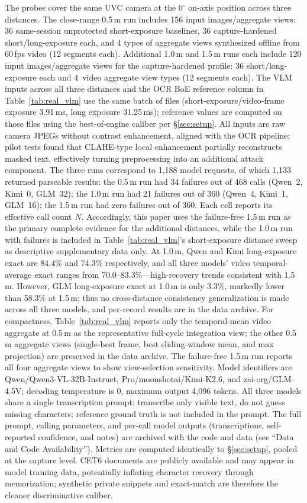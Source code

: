\documentclass{ieeeaccess}
\begin{document}
The probes cover the same UVC camera at the 0$^{\circ}$ on-axis position across three distances. The close-range 0.5\,m run includes 156 input images/aggregate views: 36 same-session unprotected short-exposure baselines, 36 capture-hardened short/long-exposure each, and 4 types of aggregate views synthesized offline from 60\,fps video (12 segments each). Additional 1.0\,m and 1.5\,m runs each include 120 input images/aggregate views for the capture-hardened profile: 36 short/long-exposure each and 4~video aggregate view types (12 segments each). The VLM inputs across all three distances and the OCR BoE reference column in Table~\ref{tab:real_vlm} use the same batch of files (short-exposure/video-frame exposure 3.91\,ms, long exposure 31.25\,ms); reference values are computed on those files using the best-of-engine caliber per \S\ref{sec:setup}. All inputs are raw camera JPEGs without contrast enhancement, aligned with the OCR pipeline; pilot tests found that CLAHE-type local enhancement partially reconstructs masked text, effectively turning preprocessing into an additional attack component. The three runs correspond to 1,188 model requests, of which 1,133 returned parseable results: the 0.5\,m run had 34 failures out of 468 calls (Qwen~2, Kimi~0, GLM~32); the 1.0\,m run had 21 failures out of 360 (Qwen~4, Kimi~1, GLM~16); the 1.5\,m run had zero failures out of 360. Each cell reports its effective call count $N$. Accordingly, this paper uses the failure-free 1.5\,m run as the primary complete evidence for the additional distances, while the 1.0\,m run with failures is included in Table~\ref{tab:real_vlm}'s short-exposure distance sweep as descriptive supplementary data only. At 1.0\,m, Qwen and Kimi long-exposure exact are 84.4\% and 74.3\% respectively, and all three models' video temporal-average exact ranges from 70.0--83.3\%---high-recovery trends consistent with 1.5\,m. However, GLM long-exposure exact at 1.0\,m is only 3.3\%, markedly lower than 58.3\% at 1.5\,m; thus no cross-distance consistency generalization is made across all three models, and per-record results are in the data archive. For compactness, Table~\ref{tab:real_vlm} reports only the temporal-mean video aggregate at 0.5\,m as the representative full-cycle integration view; the other 0.5\,m aggregate views (single-best frame, best sliding-window mean, and max projection) are preserved in the data archive. The failure-free 1.5\,m run reports all four aggregate views to show view-selection sensitivity. Model identifiers are Qwen/Qwen3-VL-32B-Instruct, Pro/moonshotai/Kimi-K2.6, and zai-org/GLM-4.5V; decoding temperature is 0, maximum output 4,096 tokens. All three models share a single transcription prompt: transcribe only visible text, do not guess missing characters; reference ground truth is not included in the prompt. The full prompt, calling parameters, and per-call model outputs (transcriptions, self-reported confidence, and notes) are archived with the code and data (see ``Data and Code Availability''). Metrics are computed identically to \S\ref{sec:setup}, pooled at the capture level. CET6 documents are publicly available and may appear in model training data, potentially inflating character recovery through memorization; synthetic private snippets and exact-match are therefore the cleaner discriminative caliber.
\end{document}
